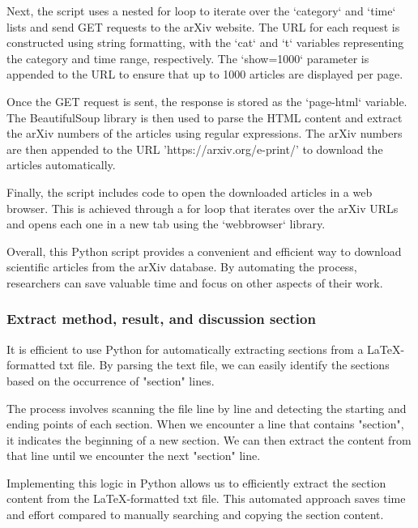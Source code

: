 \documentclass[12pt, a4paper, twocolumn]{article}
\begin{document}
			Next, the script uses a nested for loop to iterate over the `category` and `time` lists and send GET requests to the arXiv website. The URL for each request is constructed using string formatting, with the `cat` and `t` variables representing the category and time range, respectively. The `show=1000` parameter is appended to the URL to ensure that up to 1000 articles are displayed per page.
			
			Once the GET request is sent, the response is stored as the `page-html` variable. The BeautifulSoup library is then used to parse the HTML content and extract the arXiv numbers of the articles using regular expressions. The arXiv numbers are then appended to the URL 'https://arxiv.org/e-print/' to download the articles automatically.
			
			Finally, the script includes code to open the downloaded articles in a web browser. This is achieved through a for loop that iterates over the arXiv URLs and opens each one in a new tab using the `webbrowser` library.
			
			Overall, this Python script provides a convenient and efficient way to download scientific articles from the arXiv database. By automating the process, researchers can save valuable time and focus on other aspects of their work.
			
			\subsubsection{Extract method, result, and discussion section}
			
			It is efficient to use Python for automatically extracting sections from a LaTeX-formatted txt file. By parsing the text file, we can easily identify the sections based on the occurrence of "section" lines.
			
			The process involves scanning the file line by line and detecting the starting and ending points of each section. When we encounter a line that contains "section", it indicates the beginning of a new section. We can then extract the content from that line until we encounter the next "section" line.
			
			Implementing this logic in Python allows us to efficiently extract the section content from the LaTeX-formatted txt file. This automated approach saves time and effort compared to manually searching and copying the section content.
	
\end{document}
